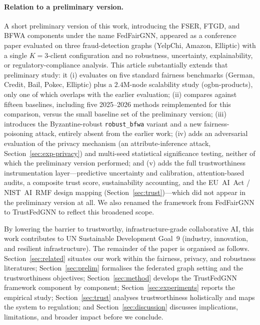 \documentclass[pdflatex,sn-mathphys-num]{sn-jnl}
\theoremstyle{thmstyleone}%
\theoremstyle{thmstyletwo}%
\theoremstyle{thmstylethree}%
\begin{document}
\paragraph{Relation to a preliminary version.}
A short preliminary version of this work, introducing the FSER, FTGD, and BFWA
components under the name FedFairGNN, appeared as a conference paper
\cite{dang2026fedfairgnn} evaluated on three fraud-detection graphs
(YelpChi, Amazon, Elliptic) with a single $K{=}3$-client configuration and no
robustness, uncertainty, explainability, or regulatory-compliance analysis. This
article substantially extends that preliminary study: it (i) evaluates on five
standard fairness benchmarks (German, Credit, Bail, Pokec, Elliptic) plus a
$2.4$M-node scalability study (ogbn-products), only one of which overlaps with
the earlier evaluation; (ii) compares against fifteen baselines, including five
2025--2026 methods reimplemented for this comparison, versus the small baseline
set of the preliminary version; (iii) introduces the Byzantine-robust
\texttt{robust\_bfwa} variant and a new fairness-poisoning attack, entirely
absent from the earlier work; (iv) adds an adversarial evaluation of the privacy
mechanism (an attribute-inference attack, Section~\ref{sec:exp-privacy}) and
multi-seed statistical significance testing, neither of which the preliminary
version performed; and (v) adds the full trustworthiness instrumentation
layer---predictive uncertainty and calibration, attention-based audits, a
composite trust score, sustainability accounting, and the EU~AI~Act / NIST~AI~RMF
design mapping (Section~\ref{sec:trust})---which did not appear in the
preliminary version at all. We also renamed the framework from FedFairGNN to
TrustFedGNN to reflect this broadened scope.

By lowering the barrier to trustworthy, infrastructure-grade collaborative AI,
this work contributes to UN Sustainable Development Goal~9 (industry,
innovation, and resilient infrastructure). The remainder of the paper is
organised as follows. Section~\ref{sec:related} situates our work within the
fairness, privacy, and robustness literatures; Section~\ref{sec:prelim}
formalises the federated graph setting and the trustworthiness objectives;
Section~\ref{sec:method} develops the TrustFedGNN framework component by
component; Section~\ref{sec:experiments} reports the empirical study;
Section~\ref{sec:trust} analyses trustworthiness holistically and maps the
system to regulation; and Section~\ref{sec:discussion} discusses implications,
limitations, and broader impact before we conclude.
\end{document}
